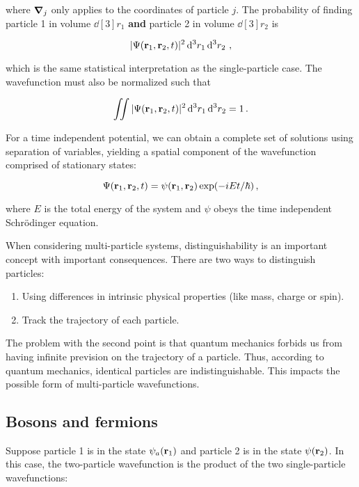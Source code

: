 \documentclass[12pt, titlepage]{article}
\begin{document}
where $\grad{}_{j}$ only applies to the coordinates of particle $j$. The probability of finding particle 1 in volume $\dd[3]{r_1}$ \textbf{and} particle 2 in volume $\dd[3]{r_2}$ is

\begin{equation}
	|\Psi(\vb{r}_1, \vb{r}_2, t)|^2\dd[3]{r_1}\dd[3]{r_2} \,,
\end{equation}

which is the same statistical interpretation as the single-particle case. The wavefunction must also be normalized such that 

\begin{equation}
\iint|\Psi(\vb{r}_1, \vb{r}_2, t)|^2\dd[3]{r_1}\dd[3]{r_2} = 1 \,.
\end{equation}

For a time independent potential, we can obtain a complete set of solutions using separation of variables, yielding a spatial component of the wavefunction comprised of stationary states:

\begin{equation}
	\Psi(\vb{r}_1,\vb{r}_2,t) = \psi(\vb{r}_1, \vb{r}_2)\exp(-iEt/\hbar) \,,
\end{equation}

where $E$ is the total energy of the system and $\psi$ obeys the time independent Schrödinger equation.

When considering multi-particle systems, distinguishability is an important concept with important consequences. There are two ways to distinguish particles:

\begin{enumerate}
	\item Using differences in intrinsic physical properties (like mass, charge or spin).
	\item Track the trajectory of each particle.
\end{enumerate}

The problem with the second point is that quantum mechanics forbids us from having infinite prevision on the trajectory of a particle. Thus, according to quantum mechanics, identical particles are indistinguishable. This impacts the possible form of multi-particle wavefunctions.

\subsection{Bosons and fermions}
Suppose particle 1 is in the state $\psi_a(\vb{r}_1)$ and particle 2 is in the state $\psi(\vb{r}_2)$. In this case, the two-particle wavefunction is the product of the two single-particle wavefunctions:
\end{document}
